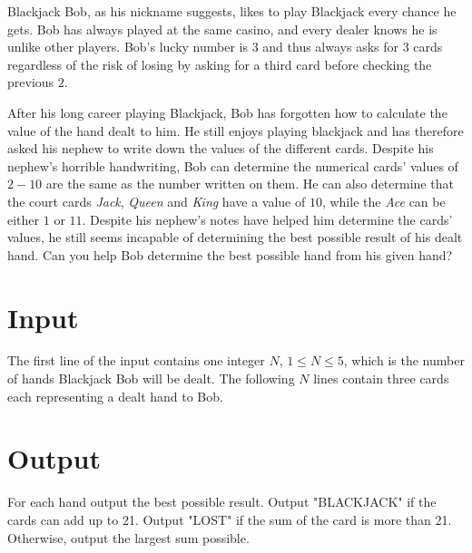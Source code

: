 Blackjack Bob, as his nickname suggests, likes to play Blackjack every chance he gets.
Bob has always played at the same casino, and every dealer knows he is unlike other players.
Bob's lucky number is $3$ and thus always asks for $3$ cards regardless of the risk of losing by asking for a third card before checking the previous $2$.

After his long career playing Blackjack, Bob has forgotten how to calculate the value of the hand dealt to him.
He still enjoys playing blackjack and has therefore asked his nephew to write down the values of the different cards.
Despite his nephew's horrible handwriting, Bob can determine the numerical cards' values of $2-10$ are the same as the number written on them.
He can also determine that the court cards \textit{Jack}, \textit{Queen} and \textit{King} have a value of $10$, while the \textit{Ace} can be either $1$ or $11$.
Despite his nephew's notes have helped him determine the cards' values, he still seems incapable of determining the best possible result of his dealt hand.
Can you help Bob determine the best possible hand from his given hand?
\section*{Input}

The first line of the input contains one integer $N$, $1 \leq N \leq 5$, which is the number of hands Blackjack Bob will be dealt.
The following $N$ lines contain three cards each representing a dealt hand to Bob.


\section*{Output}

For each hand output the best possible result.
Output "BLACKJACK" if the cards can add up to 21.
Output "LOST" if the sum of the card is more than 21.
Otherwise, output the largest sum possible.

